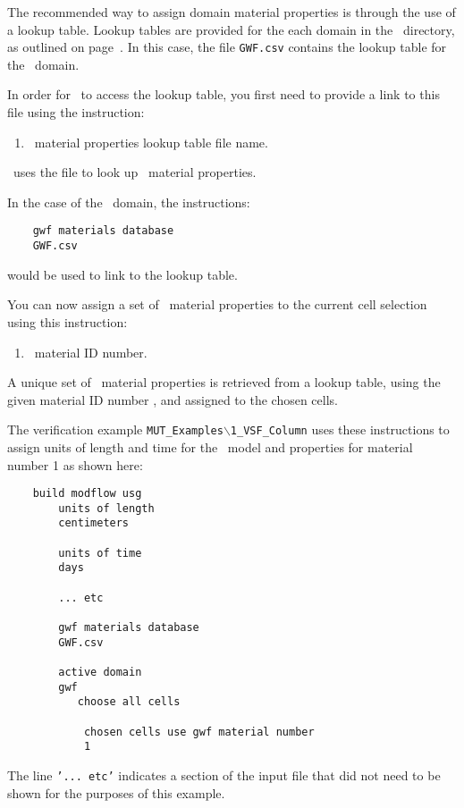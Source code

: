 {The recommended way to assign domain material properties is through the use of a lookup table.  Lookup tables are provided for the each domain in the \bin\ directory, as outlined on page~\pageref{page:userbin}. In this case, the file \texttt{GWF.csv} contains the lookup table for the \gwf\ domain.

In order for \mut\ to access the lookup table, you first need to provide a link to this file using the instruction:

    {
        \squish
        \begin{enumerate}
        \item {}  \gwf\ material properties lookup table file name.
        \end{enumerate}
          \mut\ uses the file  to look up \gwf\ material properties.
    }

In the case of the \gwf\ domain, the instructions:
\begin{verbatim}
    gwf materials database
    GWF.csv
\end{verbatim}
would be used to link to the lookup table.

You can now assign a set of \gwf\ material properties to the current cell selection using this instruction:

    {
        \squish
        \begin{enumerate}
        \item {}  \gwf\ material ID number.
        \end{enumerate}
          A unique set of \gwf\ material properties is retrieved from a lookup table, using the given  material ID number , and assigned to the chosen cells.
    }

The verification example \texttt{MUT\_Examples$\backslash$1\_VSF\_Column} uses these instructions to assign units of length and time for the \mfus\ model and properties for material number 1 as shown here:
\begin{verbatim}
    build modflow usg
        units of length
        centimeters

        units of time
        days

        ... etc

        gwf materials database
        GWF.csv

        active domain
        gwf
           choose all cells

            chosen cells use gwf material number
            1
\end{verbatim}
The line \texttt{'...\ etc'} indicates a section of the input file that did not need to be shown for the purposes of this example.

}

